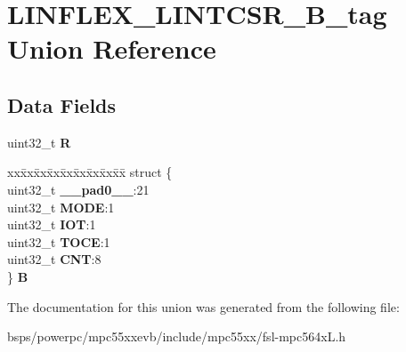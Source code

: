 \hypertarget{unionLINFLEX__LINTCSR__32B__tag}{}\section{L\+I\+N\+F\+L\+E\+X\+\_\+\+L\+I\+N\+T\+C\+S\+R\+\_\+B\+\_\+tag Union Reference}
\label{unionLINFLEX__LINTCSR__32B__tag}
\subsection*{Data Fields}
\begin{DoxyCompactItemize}
\item 
\mbox{\label{unionLINFLEX__LINTCSR__32B__tag_ab6a7e8d3a76e2f38f7fd365f9f862688}} 
uint32\+\_\+t {\bfseries R}
\item 
\mbox{\label{unionLINFLEX__LINTCSR__32B__tag_a3d30f6704b6d6a81f06c7d762707259e}} 
\begin{tabbing}
xx\=xx\=xx\=xx\=xx\=xx\=xx\=xx\=xx\=\kill
struct \{\\
\>uint32\_t {\bfseries \_\_pad0\_\_}:21\\
\>uint32\_t {\bfseries MODE}:1\\
\>uint32\_t {\bfseries IOT}:1\\
\>uint32\_t {\bfseries TOCE}:1\\
\>uint32\_t {\bfseries CNT}:8\\
\} {\bfseries B}\\

\end{tabbing}\end{DoxyCompactItemize}


The documentation for this union was generated from the following file\+:\begin{DoxyCompactItemize}
\item 
bsps/powerpc/mpc55xxevb/include/mpc55xx/fsl-\/mpc564x\+L.\+h\end{DoxyCompactItemize}
